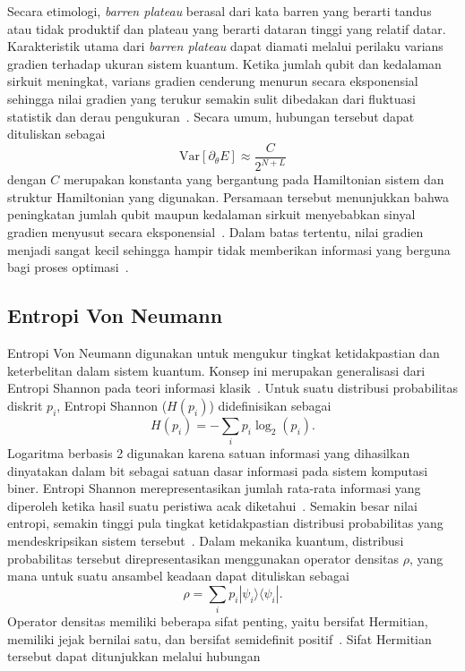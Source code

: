 Secara etimologi, \textit{barren plateau} berasal dari kata barren yang berarti tandus atau tidak produktif dan plateau yang berarti dataran tinggi yang relatif datar. Karakteristik utama dari \textit{barren plateau} dapat diamati melalui perilaku varians gradien terhadap ukuran sistem kuantum. Ketika jumlah qubit dan kedalaman sirkuit meningkat, varians gradien cenderung menurun secara eksponensial sehingga nilai gradien yang terukur semakin sulit dibedakan dari fluktuasi statistik dan derau pengukuran~. Secara umum, hubungan tersebut dapat dituliskan sebagai
\begin{equation}
    \text{Var}[\partial_\theta E] \approx \frac{C}{2^{N+L}}
\end{equation}
dengan $C$ merupakan konstanta yang bergantung pada Hamiltonian sistem dan struktur Hamiltonian yang digunakan. Persamaan tersebut menunjukkan bahwa peningkatan jumlah qubit maupun kedalaman sirkuit menyebabkan sinyal gradien menyusut secara eksponensial~. Dalam batas tertentu, nilai gradien menjadi sangat kecil sehingga hampir tidak memberikan informasi yang berguna bagi proses optimasi~\cite{barron_minimum_1991}.

\subsection{Entropi Von Neumann}
Entropi Von Neumann digunakan untuk mengukur tingkat ketidakpastian dan keterbelitan dalam sistem kuantum. Konsep ini merupakan generalisasi dari Entropi Shannon pada teori informasi klasik~\cite{shannon_mathematical_1948}. Untuk suatu distribusi probabilitas diskrit $p_i$, Entropi Shannon ($H(p_i)$) didefinisikan sebagai
\begin{equation}
    H(p_i) = - \sum_i p_i \log_2 (p_i).
\end{equation}
Logaritma berbasis 2 digunakan karena satuan informasi yang dihasilkan dinyatakan dalam bit sebagai satuan dasar informasi pada sistem komputasi biner. Entropi Shannon merepresentasikan jumlah rata-rata informasi yang diperoleh ketika hasil suatu peristiwa acak diketahui~\cite{page_information_1993}. Semakin besar nilai entropi, semakin tinggi pula tingkat ketidakpastian distribusi probabilitas yang mendeskripsikan sistem tersebut~\cite{ohya_fundamentals_1998}. Dalam mekanika kuantum, distribusi probabilitas tersebut direpresentasikan menggunakan operator densitas $\rho$, yang mana untuk suatu ansambel keadaan dapat dituliskan sebagai
\begin{equation}
    \rho = \sum_i p_i |\psi_i\rangle \langle \psi_i|.
\end{equation}
Operator densitas memiliki beberapa sifat penting, yaitu bersifat Hermitian, memiliki jejak bernilai satu, dan bersifat semidefinit positif~. Sifat Hermitian tersebut dapat ditunjukkan melalui hubungan

